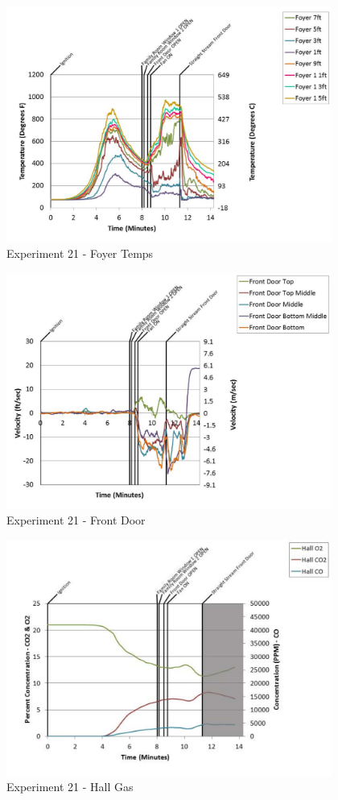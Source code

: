 \documentclass{article}
\begin{document}
\begin{appendices}
	\begin{figure}[h!]
		\centering
		\includegraphics[height=3.05in]{0_Images/Results_Charts/Exp_21_Charts/FoyerTemps.pdf}
		\caption{Experiment 21 - Foyer Temps}
	\end{figure}
 
	\clearpage

	\begin{figure}[h!]
		\centering
		\includegraphics[height=3.05in]{0_Images/Results_Charts/Exp_21_Charts/FrontDoor.pdf}
		\caption{Experiment 21 - Front Door}
	\end{figure}
 

	\begin{figure}[h!]
		\centering
		\includegraphics[height=3.05in]{0_Images/Results_Charts/Exp_21_Charts/HallGas.pdf}
		\caption{Experiment 21 - Hall Gas}
	\end{figure}
 

\end{appendices}
\end{document}
